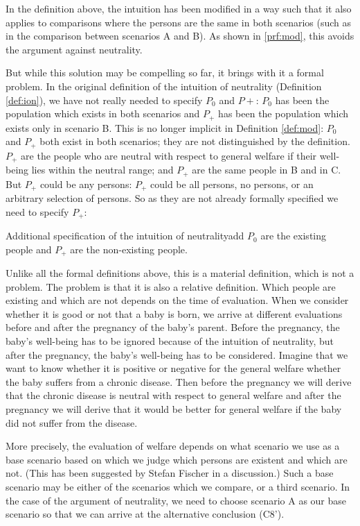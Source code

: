 In the definition above, the intuition has been modified in a way such that it also applies to comparisons where the persons are the same in both scenarios (such as in the comparison between scenarios A and B). As shown in \ref{prf:mod}, this avoids the argument against neutrality. 

But while this solution may be compelling so far, it brings with it a formal problem. In the original definition of the intuition of neutrality (Definition \ref{def:ion}), we have not really needed to specify $P_0$ and $P+$: $P_0$ has been the population which exists in both scenarios and $P_+$ has been the population which exists only in scenario B. This is no longer implicit in Definition \ref{def:mod}: $P_0$ and $P_+$ both exist in both scenarios; they are not distinguished by the definition. $P_+$ are the people who are neutral with respect to general welfare if their well-being lies within the neutral range; and $P_+$ are the same people in B and in C. But $P_+$ could be any persons: $P_+$ could be all persons, no persons, or an arbitrary selection of persons. So as they are not already formally specified we need to specify $P_+$:

\begin{Definition}{Additional specification of the intuition of neutrality}{add}
$P_0$ are the existing people and $P_+$ are the non-existing people.
\end{Definition}

Unlike all the formal definitions above, this is a material definition, which is not a problem. The problem is that it is also a relative definition. Which people are existing and which are not depends on the time of evaluation. When we consider whether it is good or not that a baby is born, we arrive at different evaluations before and after the pregnancy of the baby's parent. Before the pregnancy, the baby's well-being has to be ignored because of the intuition of neutrality, but after the pregnancy, the baby's well-being has to be considered. Imagine that we want to know whether it is positive or negative for the general welfare whether the baby suffers from a chronic disease. Then before the pregnancy we will derive that the chronic disease is neutral with respect to general welfare and after the pregnancy we will derive that it would be better for general welfare if the baby did not suffer from the disease.  

More precisely, the evaluation of welfare depends on what scenario we use as a base scenario based on which we judge which persons are existent and which are not. (This has been suggested by Stefan Fischer in a discussion.) Such a base scenario may be either of the scenarios which we compare, or a third scenario. In the case of the argument of neutrality, we need to choose scenario A as our base scenario so that we can arrive at the alternative conclusion (C8’). 


